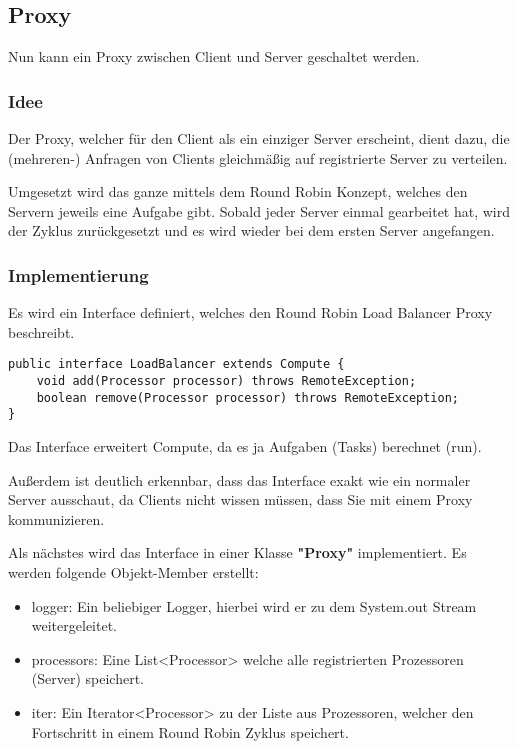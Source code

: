 \subsection{Proxy}
Nun kann ein Proxy zwischen Client und Server geschaltet werden.

\subsubsection{Idee}
Der Proxy, welcher für den Client als ein einziger Server erscheint, dient dazu, die (mehreren-) Anfragen von Clients gleichmäßig auf registrierte Server zu verteilen.

Umgesetzt wird das ganze mittels dem Round Robin Konzept, welches den Servern jeweils eine Aufgabe gibt. Sobald jeder Server einmal gearbeitet hat, wird der Zyklus zurückgesetzt und es wird wieder bei dem ersten Server angefangen.

\subsubsection{Implementierung}
Es wird ein Interface definiert, welches den Round Robin Load Balancer Proxy beschreibt.

\begin{lstlisting}[style=Java, caption=Proxy Implementation - LoadBalancer Interface]
public interface LoadBalancer extends Compute {
    void add(Processor processor) throws RemoteException;
	boolean remove(Processor processor) throws RemoteException;
}
\end{lstlisting}

Das Interface erweitert Compute, da es ja Aufgaben (Tasks) berechnet (run).

Außerdem ist deutlich erkennbar, dass das Interface exakt wie ein normaler Server ausschaut, da Clients nicht wissen müssen, dass Sie mit einem Proxy kommunizieren.

Als nächstes wird das Interface in einer Klasse \textbf{"Proxy"} implementiert.
Es werden folgende Objekt-Member erstellt:

\begin{itemize}
	\item logger: Ein beliebiger Logger, hierbei wird er zu dem System.out Stream weitergeleitet.
	\item processors: Eine List<Processor> welche alle registrierten Prozessoren (Server) speichert.
	\item iter: Ein Iterator<Processor> zu der Liste aus Prozessoren, welcher den Fortschritt in einem Round Robin Zyklus speichert.
\end{itemize}

